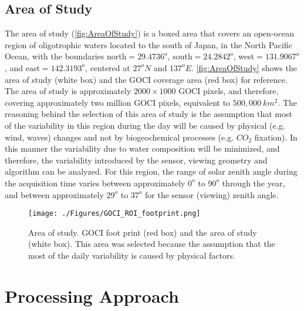 \documentclass[onecolumn,3p,letterpaper,11pt]{elsarticle}
\begin{document}
\subsection{Area of Study}

The area of study (\autoref{fig:AreaOfStudy}) is a boxed area that covers an open-ocean region of oligotrophic waters located to the south of Japan, in the North Pacific Ocean, with the boundaries north$=29.4736^o$, south$=24.2842^o$, west$=131.9067^o$, and east$=142.3193^o$, centered at $27^oN$ and $137^oE$. \autoref{fig:AreaOfStudy} shows the area of study (white box) and the GOCI coverage area (red box) for reference. The area of study is approximately $2000\times 1000$ GOCI pixels, and therefore, covering approximately two million GOCI pixels, equivalent to $500,000\ km^2$. The reasoning behind the selection of this area of study is the assumption that most of the variability in this region during the day will be caused by physical (e.g. wind, waves) changes and not by biogeochemical processes (e.g. $CO_2$ fixation). In this manner the variability due to water composition will be minimized, and therefore, the variability introduced by the sensor, viewing geometry and algorithm can be analyzed. For this region, the range of solar zenith angle during the acquisition time  varies between approximately $0^o$ to $90^o$ through the year, and between approximately $29^o$ to $37^o$ for the sensor (viewing) zenith angle.

\begin{figure}[ht]
	\centering
    \texttt{[image: ./Figures/GOCI\_ROI\_footprint.png]}
	\caption{Area of study. GOCI foot print (red box) and the area of study (white box). This area was selected because the assumption that the most of the daily variability is caused by physical factors.}
	\label{fig:AreaOfStudy}
\end{figure}
\section{Processing Approach}
\label{sec:processing}
\end{document}
